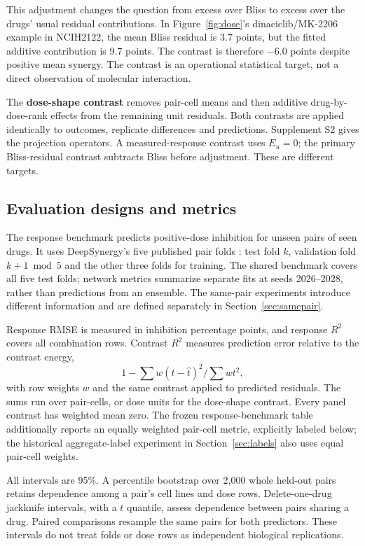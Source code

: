 \documentclass[11pt]{article}
\begin{document}
This adjustment changes the question from excess over Bliss to excess over the drugs' usual residual contributions. In Figure~\ref{fig:dose}'s dinaciclib/MK-2206 example in NCIH2122, the mean Bliss residual is 3.7 points, but the fitted additive contribution is 9.7 points. The contrast is therefore −6.0 points despite positive mean synergy. The contrast is an operational statistical target, not a direct observation of molecular interaction.

The \textbf{dose-shape contrast} removes pair-cell means and then additive drug-by-dose-rank effects from the remaining unit residuals. Both contrasts are applied identically to outcomes, replicate differences and predictions. Supplement S2 gives the projection operators. A measured-response contrast uses $E_u=0$; the primary Bliss-residual contrast subtracts Bliss before adjustment. These are different targets.

\subsection{Evaluation designs and metrics}\label{sec:design}
The response benchmark predicts positive-dose inhibition for unseen pairs of seen drugs. It uses DeepSynergy's five published pair folds \citep{preuer2018}: test fold $k$, validation fold $k+1\bmod5$ and the other three folds for training. The shared benchmark covers all five test folds; network metrics summarize separate fits at seeds 2026–2028, rather than predictions from an ensemble. The same-pair experiments introduce different information and are defined separately in Section~\ref{sec:samepair}.

Response RMSE is measured in inhibition percentage points, and response $R^2$ covers all combination rows. Contrast $R^2$ measures prediction error relative to the contrast energy,
\begin{equation}\label{eq:cr2}
1-\sum w(t-\hat t)^2\Big/\sum wt^2 ,
\end{equation}
with row weights $w$ and the same contrast applied to predicted residuals. The sums run over pair-cells, or dose units for the dose-shape contrast. Every panel contrast has weighted mean zero. The frozen response-benchmark table additionally reports an equally weighted pair-cell metric, explicitly labeled below; the historical aggregate-label experiment in Section~\ref{sec:labels} also uses equal pair-cell weights.

All intervals are 95\%. A percentile bootstrap over 2,000 whole held-out pairs retains dependence among a pair's cell lines and dose rows. Delete-one-drug jackknife intervals, with a $t$ quantile, assess dependence between pairs sharing a drug. Paired comparisons resample the same pairs for both predictors. These intervals do not treat folds or dose rows as independent biological replications.
\end{document}
